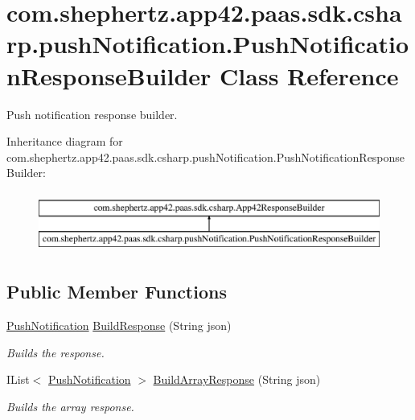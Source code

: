 \hypertarget{classcom_1_1shephertz_1_1app42_1_1paas_1_1sdk_1_1csharp_1_1push_notification_1_1_push_notification_response_builder}{\section{com.\+shephertz.\+app42.\+paas.\+sdk.\+csharp.\+push\+Notification.\+Push\+Notification\+Response\+Builder Class Reference}
\label{classcom_1_1shephertz_1_1app42_1_1paas_1_1sdk_1_1csharp_1_1push_notification_1_1_push_notification_response_builder}
}


Push notification response builder.  


Inheritance diagram for com.\+shephertz.\+app42.\+paas.\+sdk.\+csharp.\+push\+Notification.\+Push\+Notification\+Response\+Builder\+:\begin{figure}[H]
\begin{center}
\leavevmode
\includegraphics[height=2.000000cm]{classcom_1_1shephertz_1_1app42_1_1paas_1_1sdk_1_1csharp_1_1push_notification_1_1_push_notification_response_builder}
\end{center}
\end{figure}
\subsection*{Public Member Functions}
\begin{DoxyCompactItemize}
\item 
\hyperlink{classcom_1_1shephertz_1_1app42_1_1paas_1_1sdk_1_1csharp_1_1push_notification_1_1_push_notification}{Push\+Notification} \hyperlink{classcom_1_1shephertz_1_1app42_1_1paas_1_1sdk_1_1csharp_1_1push_notification_1_1_push_notification_response_builder_a9bd411f89f8e148fd297a838eff59870}{Build\+Response} (String json)
\begin{DoxyCompactList}\small\item\em Builds the response. \end{DoxyCompactList}\item 
I\+List$<$ \hyperlink{classcom_1_1shephertz_1_1app42_1_1paas_1_1sdk_1_1csharp_1_1push_notification_1_1_push_notification}{Push\+Notification} $>$ \hyperlink{classcom_1_1shephertz_1_1app42_1_1paas_1_1sdk_1_1csharp_1_1push_notification_1_1_push_notification_response_builder_a0bfe6828587649edbaac0532e976a61c}{Build\+Array\+Response} (String json)
\begin{DoxyCompactList}\small\item\em Builds the array response. \end{DoxyCompactList}\end{DoxyCompactItemize}


